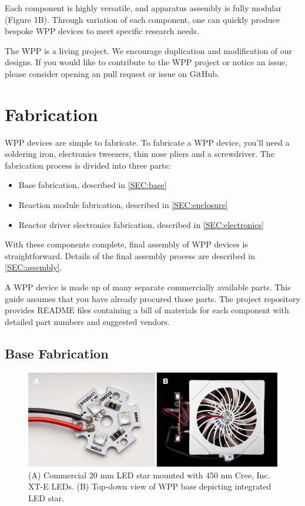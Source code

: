 \documentclass[11pt]{article}
\let\stdsection\section
\renewcommand\section{\clearpage\stdsection}
\begin{document}
Each component is highly versatile, and apparatus assembly is fully modular (Figure 1B).
Through variation of each component, one can quickly produce bespoke WPP devices to meet specific research needs.

The WPP is a living project.
We encourage duplication and modification of our designs.
If you would like to contribute to the WPP project or notice an issue, please consider opening an pull request or issue on GitHub.

\section{Fabrication}

WPP devices are simple to fabricate.
To fabricate a WPP device, you'll need a soldering iron, electronics tweezers, thin nose pliers and a screwdriver.
The fabrication process is divided into three parts:

\begin{itemize}
	\item Base fabrication, described in \autoref{SEC:base}
	\item Reaction module fabrication, described in \autoref{SEC:enclosure}
	\item Reactor driver electronics fabrication, described in \autoref{SEC:electronics}
\end{itemize}

With these components complete, final assembly of WPP devices is straightforward.
Details of the final assembly process are described in \autoref{SEC:assembly}.

A WPP device is made up of many separate commercially available parts.
This guide assumes that you have already procured those parts.
The project repository provides README files containing a bill of materials for each component with detailed part numbers and suggested vendors.

\subsection{Base Fabrication} \label{SEC:base}

\begin{figure}[H]
	\includegraphics[width=\textwidth]{"./fig2.png"}
	\caption{(A) Commercial 20 mm LED star mounted with 450 nm Cree, Inc. XT-E LEDs. (B) Top-down view of WPP base depicting integrated LED star.}
\end{figure}
\end{document}
